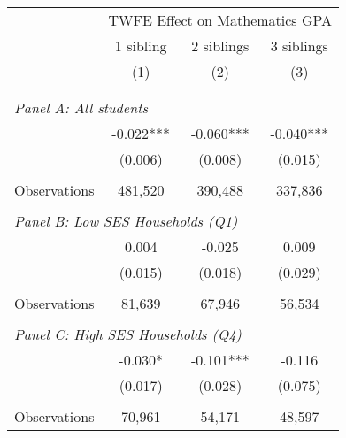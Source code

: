 \makeatletter
{}
{
\makeatother
\begin{tabular}{lccc}
\toprule
\cmidrule(lr){2-4}
& \multicolumn{3}{c}{TWFE Effect on Mathematics GPA} \\
\cmidrule(lr){2-4}
& 1 sibling & 2 siblings & 3 siblings  \\
\cmidrule(lr){2-2} \cmidrule(lr){3-3} \cmidrule(lr){4-4}
& (1) & (2) & (3)\\
\bottomrule
&  &  &  \\
&  &  &   \\
\multicolumn{4}{l}{\textit{Panel A: All students}} \\
\hspace{3mm}        &      -0.022***&      -0.060***&      -0.040***\\
                    &     (0.006)   &     (0.008)   &     (0.015)   \\
                    &               &               &               \\
\hspace{3mm}Observations&     481,520   &     390,488   &     337,836   \\
 
&  &  &   \\
\multicolumn{4}{l}{\textit{Panel B: Low SES Households (Q1)}} \\
\hspace{3mm}        &       0.004   &      -0.025   &       0.009   \\
                    &     (0.015)   &     (0.018)   &     (0.029)   \\
                    &               &               &               \\
\hspace{3mm}Observations&      81,639   &      67,946   &      56,534   \\
 
&  &  &   \\
\multicolumn{4}{l}{\textit{Panel C: High SES Households (Q4)}} \\
\hspace{3mm}        &      -0.030*  &      -0.101***&      -0.116   \\
                    &     (0.017)   &     (0.028)   &     (0.075)   \\
                    &               &               &               \\
\hspace{3mm}Observations&      70,961   &      54,171   &      48,597   \\
 

\end{tabular}}
